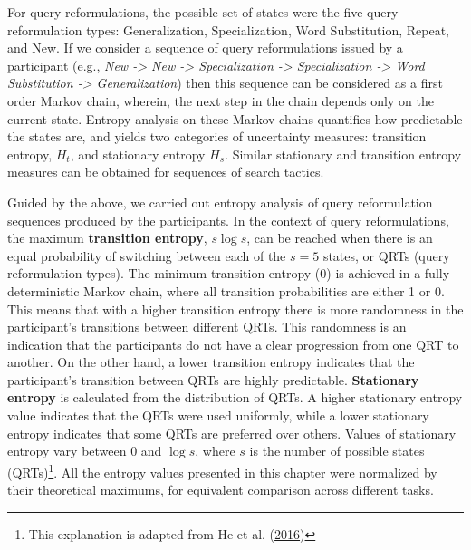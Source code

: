 \documentclass[letterpaper, nobind]{templates/ociamthesis}
\begin{document}
For query reformulations, the possible set of states were the five query reformulation types:
Generalization, Specialization, Word Substitution, Repeat, and New.
If we consider a sequence of query reformulations issued by a participant
(e.g., \emph{New -\textgreater{} New -\textgreater{} Specialization -\textgreater{} Specialization -\textgreater{} Word Substitution -\textgreater{} Generalization})
then this sequence can be considered as a first order Markov chain, wherein, the next step in the chain depends only on the current state.
Entropy analysis on these Markov chains quantifies how predictable the states are, and yields two categories of uncertainty measures: transition entropy, \(H_t\), and stationary entropy \(H_s\).
Similar stationary and transition entropy measures can be obtained for sequences of search tactics.

Guided by the above, we carried out entropy analysis of query reformulation sequences produced by the participants.
In the context of query reformulations, the maximum \textbf{transition entropy}, \(s \log s\), can be reached when there is an equal probability of switching between each of the \(s = 5\) states, or QRTs (query reformulation types).
The minimum transition entropy (0) is achieved in a fully deterministic Markov chain, where all transition probabilities are either 1 or 0.
This means that with a higher transition entropy there is more randomness in the participant's transitions between different QRTs.
This randomness is an indication that the participants do not have a clear progression from one QRT to another.
On the other hand, a lower transition entropy indicates that the participant's transition between QRTs are highly predictable.
\textbf{Stationary entropy} is calculated from the distribution of QRTs.
A higher stationary entropy value indicates that the QRTs were used uniformly, while a lower stationary entropy indicates that some QRTs are preferred over others.
Values of stationary entropy vary between 0 and \(\log s\), where \(s\) is the number of possible states (QRTs)\footnote{This explanation is adapted from He et al. (\protect\hyperlink{ref-he2016beyond}{2016})}.
All the entropy values presented in this chapter were normalized by their theoretical maximums, for equivalent comparison across different tasks.
\end{document}
